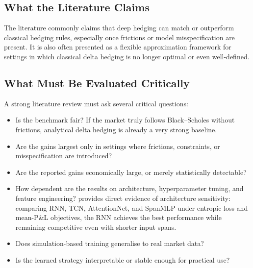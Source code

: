 \documentclass[12pt, a4paper]{article}
\begin{document}
\subsection{What the Literature Claims}
\label{subsec:dh_claims}

The literature commonly claims that deep hedging can match or outperform classical
hedging rules, especially once frictions or model misspecification are present. It is
also often presented as a flexible approximation framework for settings in which
classical delta hedging is no longer optimal or even well-defined.


\subsection{What Must Be Evaluated Critically}
\label{subsec:dh_critical}

A strong literature review must ask several critical questions:
\begin{itemize}
    \item Is the benchmark fair? If the market truly follows Black--Scholes without
          frictions, analytical delta hedging is already a very strong baseline.
    \item Are the gains largest only in settings where frictions, constraints, or
          misspecification are introduced?
    \item Are the reported gains economically large, or merely statistically
          detectable?
    \item How dependent are the results on architecture, hyperparameter tuning,
          and feature engineering? \citet{Stangroom2021} provides direct evidence
          of architecture sensitivity: comparing RNN, TCN, AttentionNet, and SpanMLP
          under entropic loss and mean-P\&L objectives, the RNN achieves the best
          performance while remaining competitive even with shorter input spans.
    \item Does simulation-based training generalise to real market data?
    \item Is the learned strategy interpretable or stable enough for practical use?
\end{itemize}
\end{document}
